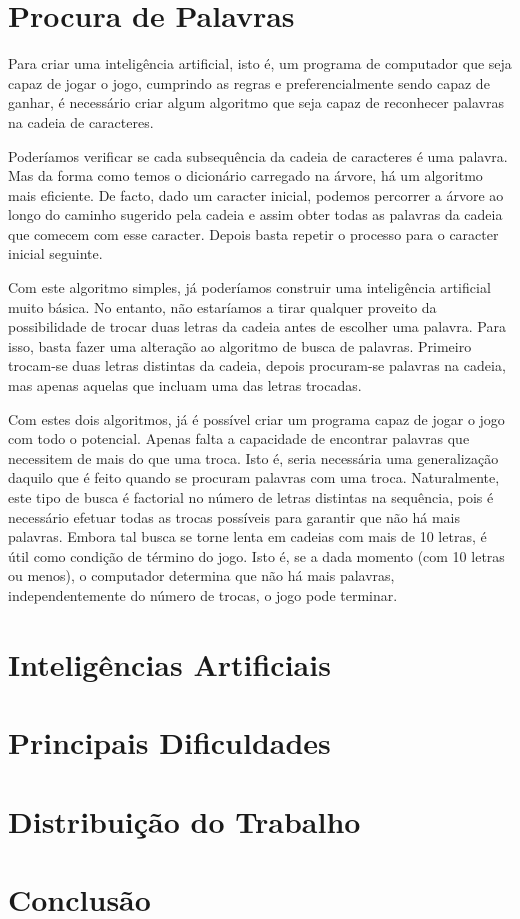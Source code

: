 \documentclass[12pt,a4paper,reqno]{report}
\numberwithin{equation}{section}
\begin{document}
\chapter{Procura de Palavras}

Para criar uma inteligência artificial, isto é, um programa de computador que seja capaz de jogar o jogo, cumprindo as regras e preferencialmente sendo capaz de ganhar, é necessário criar algum algoritmo que seja capaz de reconhecer palavras na cadeia de caracteres. 

Poderíamos verificar se cada subsequência da cadeia de caracteres é uma palavra. Mas da forma como temos o dicionário carregado na árvore, há um algoritmo mais eficiente. De facto, dado um caracter inicial, podemos percorrer a árvore ao longo do caminho sugerido pela cadeia e assim obter todas as palavras da cadeia que comecem com esse caracter. Depois basta repetir o processo para o caracter inicial seguinte.

Com este algoritmo simples, já poderíamos construir uma inteligência artificial muito básica. No entanto, não estaríamos a tirar qualquer proveito da possibilidade de trocar duas letras da cadeia antes de escolher uma palavra. Para isso, basta fazer uma alteração ao algoritmo de busca de palavras. Primeiro trocam-se duas letras distintas da cadeia, depois procuram-se palavras na cadeia, mas apenas aquelas que incluam uma das letras trocadas.

Com estes dois algoritmos, já é possível criar um programa capaz de jogar o jogo com todo o potencial. Apenas falta a capacidade de encontrar palavras que necessitem de mais do que uma troca. Isto é, seria necessária uma generalização daquilo que é feito quando se procuram palavras com uma troca. Naturalmente, este tipo de busca é factorial no número de letras distintas na sequência, pois é necessário efetuar todas as trocas possíveis para garantir que não há mais palavras. Embora tal busca se torne lenta em cadeias com mais de 10 letras, é útil como condição de término do jogo. Isto é, se a dada momento (com 10 letras ou menos), o computador determina que não há mais palavras, independentemente do número de trocas, o jogo pode terminar.

\chapter{Inteligências Artificiais}




\chapter{Principais Dificuldades}


\chapter{Distribuição do Trabalho}

\chapter{Conclusão}
\end{document}

